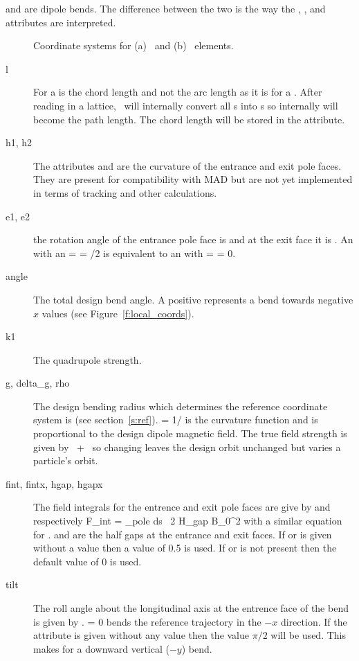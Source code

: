  and  are dipole bends. The difference between
the two is the way the , , and  attributes are interpreted.
\begin{figure}
  \centering
  \hspace{1cm}
  \caption{Coordinate systems for (a) \ and (b) \ 
  elements.}
\end{figure}

  \begin{description}
  \item[l]  
For a   is the chord length and not the arc length as
it is for a .  After reading in a lattice, \bmad\ will
internally convert all \vn{Rbend}s into \vn{Sbend}s so internally
\vn{l} will become the path length. The chord length will be stored in
the \vn{l_chord} attribute.
  \item[h1, h2]
The attributes  and  are the curvature of the entrance
and exit pole faces. They are present for compatibility with MAD but
are not yet implemented in terms of tracking and other calculations.
  \item[e1, e2]
the rotation angle of the entrance pole face is  and at the exit
face it is . An \vn{Sbend} with an  = \vn{e2} =
/2 is equivalent to an  with \vn{e1} =  =
0.
  \item[angle]
The total design bend angle. A positive  represents a
bend towards negative $x$ values (see Figure~\ref{f:local_coords}).
  \item[k1]
The quadrupole strength.
  \item[g, delta\_g, rho]
The design bending radius which determines the reference coordinate
system is  (see section~\ref{s:ref}).  \vn{g} = 1/\vn{rho} is
the curvature function and is proportional to the design dipole
magnetic field. The true field strength is given by
~+~ so changing \vn{delta_g} leaves the design orbit
unchanged but varies a particle's orbit.
  \item[fint, fintx, hgap, hgapx]
The field integrals for the entrence and
exit pole faces are give by  and  respectively
\Begineq
  F_{int} = \int_{pole} \! \! ds \, 
  {2 H_{gap} B_0^2}
\Endeq
with a similar equation for .  and  are
the half gaps at the entrance and exit faces. If  or
 is given without a value then a value of 0.5 is used. If
\vn{fint} or \vn{fintx} is not present then the default value of 0 is
used.
  \item[tilt]
The roll angle about the longitudinal axis at the entrence face of the
bend is given by .   = 0 bends the reference
trajectory in the $-x$ direction.  If the \vn{tilt} attribute is given
without any value then the value $\pi/2$ will be used. This makes for
a downward vertical ($-y$) bend.
  \end{description}


